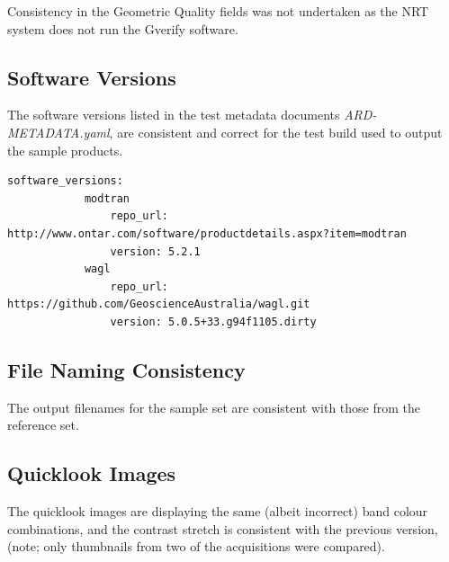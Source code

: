 \documentclass[a4paper]{article}
\begin{document}
      \begin{flushleft}
        Consistency in the Geometric Quality fields was not undertaken as the NRT system does not run the Gverify software.
      \end{flushleft}

    \subsection{Software Versions}

      \begin{flushleft}
        The software versions listed in the test metadata documents \textit{ARD-METADATA.yaml}, are consistent and correct for the test build used to output the sample products. \par
      \end{flushleft}

      \begin{lstlisting}[breaklines=true]
        software_versions:
            modtran
                repo_url: http://www.ontar.com/software/productdetails.aspx?item=modtran
                version: 5.2.1
            wagl
                repo_url: https://github.com/GeoscienceAustralia/wagl.git
                version: 5.0.5+33.g94f1105.dirty
      \end{lstlisting}

    \subsection{File Naming Consistency}

      \begin{flushleft}
        The output filenames for the sample set are consistent with those from the reference set.
      \end{flushleft}

    \subsection{Quicklook Images}

      \begin{flushleft}
        The quicklook images are displaying the same (albeit incorrect) band colour combinations, and the contrast stretch is consistent with the previous version, (note; only thumbnails from two of the acquisitions were compared).\par
      \end{flushleft}

  \clearpage
\end{document}
